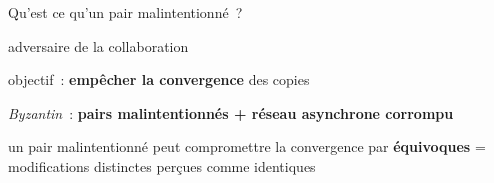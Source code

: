\begin{frame}{Qu'est ce qu'un pair malintentionné~?}
\begin{minipage}[c][.55\textheight][t]{\textwidth}
    \end{minipage}
    \begin{minipage}{\textwidth}
        \begin{compactitemize}
            \item adversaire de la collaboration
            \begin{compactitemize}
                \item objectif~: \textbf{empêcher la convergence} des copies
                \item \emph{Byzantin}~: \textbf{pairs malintentionnés + réseau asynchrone corrompu}
            \end{compactitemize}
            \item un pair malintentionné peut compromettre la convergence par \textbf{équivoques} = modifications distinctes perçues comme identiques
        \end{compactitemize}
    \end{minipage}
\end{frame}


